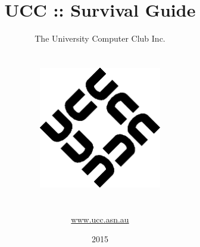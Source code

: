\begin{titlepage}


\title{UCC :: Survival Guide}
\author{The University Computer Club Inc. \\ \\ \\
	\includegraphics[width=0.4\textwidth]{figures/ucc-logo.png} \\  \\ \\ %
	\url{www.ucc.asn.au}\\
}

\date{2015}



\maketitle
\centering



\end{titlepage}
